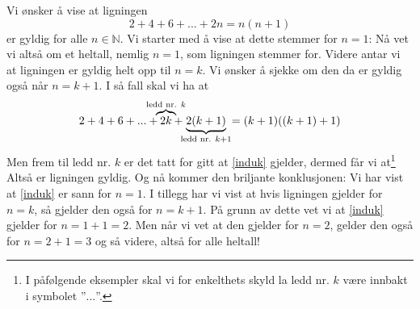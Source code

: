 Vi ønsker å vise at ligningen
\begin{equation}
2+4+6+...+2n=n(n+1) \label{induk}
\end{equation}
er gyldig for alle $n\in\mathbb{N}$. Vi starter med å vise at dette stemmer for $ {n=1} $:
Nå vet vi altså om et heltall, nemlig $ {n=1} $, som ligningen stemmer for. Videre antar vi at ligningen er gyldig helt opp til $n=k $. Vi ønsker å sjekke om den da er gyldig også når $ n=k+1 $. I så fall skal vi ha at
\[ 2+4+6+...+\quad\mathclap{\overbrace{2k}^{\text{ledd nr. }k} \;\;\;\,}+\quad\;\;\;\mathclap{\underbrace{2(k+1)}_{\text{ledd nr. }k+1}}\qquad=(k+1)((k+1)+1) \]
Men frem til ledd nr. $ k $ er det tatt for gitt at \eqref{induk} gjelder, dermed får vi at\footnote{I påfølgende eksempler skal vi for enkelthets skyld la ledd nr. $ k $ være innbakt i symbolet ''$ ... $''. }
Altså er ligningen gyldig. Og nå kommer den briljante konklusjonen: Vi har vist at \eqref{induk} er sann for ${ n=1 }$. I tillegg har vi vist at hvis ligningen gjelder for ${n= k} $, så gjelder den også for $ {n=k+1} $. På grunn av dette vet vi at \eqref{induk} gjelder for ${n= 1+1=2} $. Men når vi vet at den gjelder for $ {n=2} $, gelder den også for $ {n=2+1=3} $ og så videre, altså for alle heltall!\regv
{}
